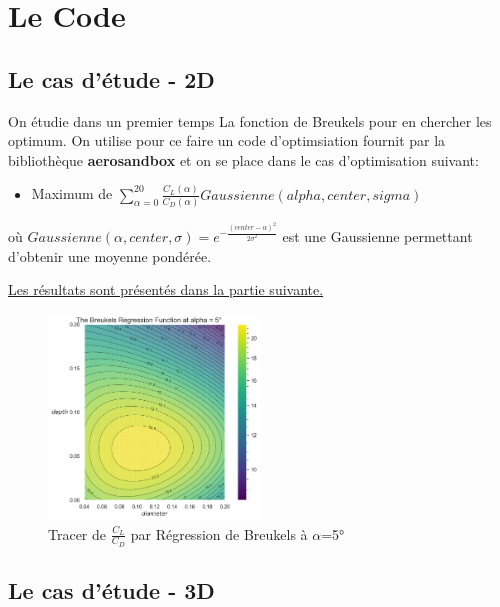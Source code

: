 \section{Le Code }
\label{sec:Ch1}

\subsection{Le cas d'étude - 2D} 
\label{sec:Ch1.1}

On étudie dans un premier temps La fonction de Breukels pour en chercher les optimum. On utilise pour ce faire un code d'optimsiation fournit par la bibliothèque \textbf{aerosandbox} et on se place dans le cas d'optimisation suivant: 
\begin{itemize}
    \item Maximum de $\sum_{\alpha = 0}^{20}\frac{C_L(\alpha)}{C_D(\alpha)} Gaussienne(alpha, center, sigma) $
\end{itemize}

    où $Gaussienne(\alpha, center, \sigma) = e^{-\frac{(center - \alpha)^2}{2\sigma^2}}$ est une Gaussienne permettant d'obtenir une moyenne pondérée. 

\underline{Les résultats sont présentés dans la partie suivante.}
\begin{figure}[H]
    \centering
    \includegraphics[width=0.5\textwidth]{Pics/breukels.png}  
    \caption{Tracer de $\frac{C_L}{C_D}$ par Régression de Breukels à $\alpha$=5°}
    \label{fig:breukels}
\end{figure}

\subsection{Le cas d'étude - 3D} 
\label{sec:Ch1.2}

